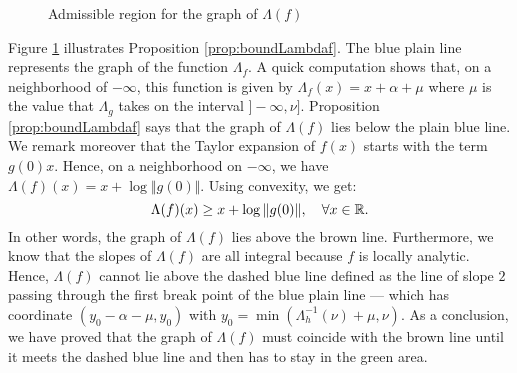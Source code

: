 \documentclass{sig-alternate}
\begin{document}
\begin{figure}
\null \hfill
{}
\hfill \null

\caption{Admissible region for the graph of $\Lambda(f)$}
\label{fig:area}
\end{figure}

Figure \ref{fig:area} illustrates Proposition \ref{prop:boundLambdaf}. 
The blue plain line represents the graph of the function $\Lambda_f$. A 
quick computation shows that, on a neighborhood of ${-}\infty$, this 
function is given by $\Lambda_f(x) = x + \alpha + \mu$
where $\mu$ is the value that $\Lambda_g$ takes on the interval 
$]{-}\infty, \nu]$. Proposition \ref{prop:boundLambdaf} says that the
graph of $\Lambda(f)$ lies below the plain blue line. We remark
moreover that the Taylor expansion of $f(x)$ starts with the term
$g(0) x$. Hence, on a neighborhood on ${-}\infty$, we have 
$\Lambda(f)(x) = x + \log \Vert g(0) \Vert$. Using convexity, we 
get:
$$\Lambda(f)(x) \geq x + \log \Vert g(0) \Vert, 
  \quad \forall x \in \mathbb R.$$
In other words, the graph of $\Lambda(f)$ lies above the brown line.
Furthermore, we know that the slopes of $\Lambda(f)$ are all integral
because $f$ is locally analytic. Hence, $\Lambda(f)$ cannot lie above
the dashed blue line defined as the line of slope $2$ passing through
the first break point of the blue plain line --- which has coordinate 
$(y_0 - \alpha - \mu, y_0)$ with $y_0 = \min(\Lambda_h^{-1}(\nu) + \mu, 
\nu)$. As a conclusion, we have proved that the graph of $\Lambda(f)$ 
must coincide with the brown line until it meets the dashed blue line 
and then has to stay in the green area.
\end{document}
